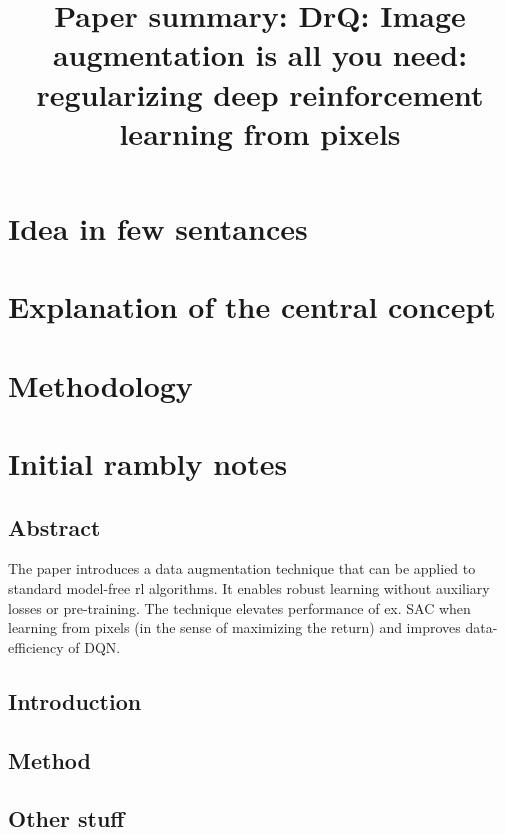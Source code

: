\documentclass{article}
\title{Paper summary: DrQ: Image augmentation is all you need: regularizing deep reinforcement learning from pixels}
\begin{document}
\maketitle


\section{Idea in few sentances}



\section{Explanation of the central concept}




\section{Methodology}


\section{Initial rambly notes}


\subsection{Abstract}
The paper introduces a data augmentation technique that can be applied to standard
model-free rl algorithms.
It enables robust learning without auxiliary losses or pre-training.
The technique elevates performance of ex. SAC when learning from pixels (in the sense of maximizing the return)
and improves data-efficiency of DQN.


\subsection{Introduction}

\subsection{Method}

\subsection{Other stuff}
\end{document}
